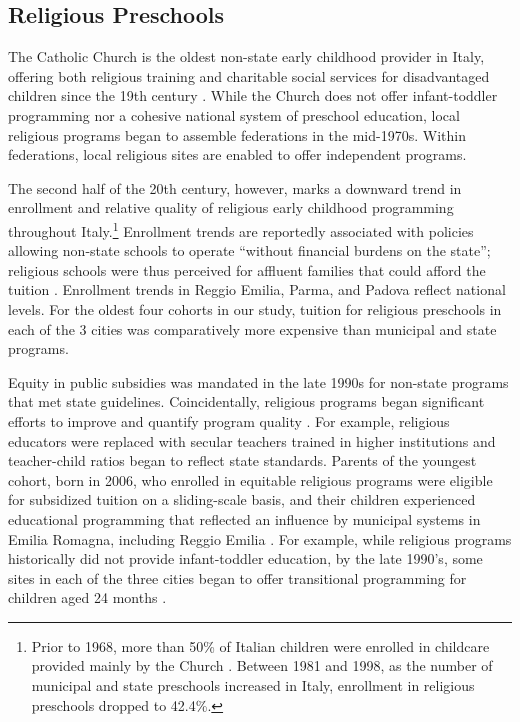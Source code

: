 \subsection{Religious Preschools}

The Catholic Church is the oldest non-state early childhood provider in Italy, offering both religious training and charitable social services for disadvantaged children since the 19th century \citep{OECD_2001_Italy-Country-Note}. While the Church does not offer infant-toddler programming nor a cohesive national system of preschool education, local religious programs began to assemble federations in the mid-1970s. Within federations, local religious sites are enabled to offer independent programs. 

The second half of the 20th century, however, marks a downward trend in enrollment and relative quality of religious early childhood programming throughout Italy.\footnote{Prior to 1968, more than 50\% of Italian children were enrolled in childcare provided mainly by the Church \citep{Hohnerlein_2009_Paradox-Public-Preschools}. Between 1981 and 1998, as the number of municipal and state preschools increased in Italy, enrollment in religious preschools dropped to 42.4\%.} Enrollment trends are reportedly associated with policies allowing non-state schools to operate ``without financial burdens on the state''; religious schools were thus perceived for affluent families that could afford the tuition \citep{Ribolzi_2013_Italy,Hohnerlein_2009_Paradox-Public-Preschools}. Enrollment trends in Reggio Emilia, Parma, and Padova reflect national levels. For the oldest four cohorts in our study, tuition for religious preschools in each of the 3 cities was comparatively more expensive than municipal and state programs. 

Equity in public subsidies was mandated in the late 1990s for non-state programs that met state guidelines. Coincidentally, religious programs began significant efforts to improve and quantify program quality \citep{Malizia-Cicatelli_2011_BOOK_Catholic-School}. For example, religious educators were replaced with secular teachers trained in higher institutions and teacher-child ratios began to reflect state standards. Parents of the youngest cohort, born in 2006, who enrolled in equitable religious programs were eligible for subsidized tuition on a sliding-scale basis, and their children experienced educational programming that reflected an influence by municipal systems in Emilia Romagna, including Reggio Emilia \citep{Hohnerlein_2009_Paradox-Public-Preschools,OECD_2001_Italy-Country-Note}. For example, while religious programs historically did not provide infant-toddler education, by the late 1990's, some sites in each of the three cities began to offer transitional programming for children aged 24 months \citep{Malizia-Cicatelli_2011_BOOK_Catholic-School,CEHD_2016_Historical-Analysis}. 

